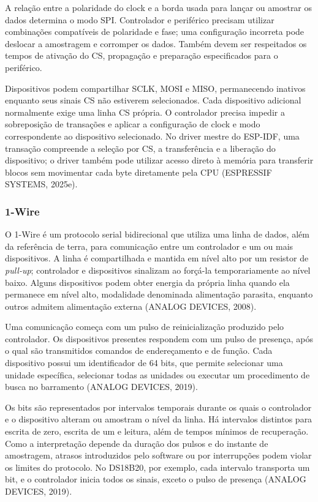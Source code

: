 \documentclass[a4paper,12pt]{article}
\begin{document}
A rela\c{c}\~ao entre a polaridade do clock e a borda usada para lan\c{c}ar ou amostrar os dados determina o modo SPI. Controlador e perif\'erico precisam utilizar combina\c{c}\~oes compat\'iveis de polaridade e fase; uma configura\c{c}\~ao incorreta pode deslocar a amostragem e corromper os dados. Tamb\'em devem ser respeitados os tempos de ativa\c{c}\~ao do CS, propaga\c{c}\~ao e prepara\c{c}\~ao especificados para o perif\'erico.


Dispositivos podem compartilhar SCLK, MOSI e MISO, permanecendo inativos enquanto seus sinais CS n\~ao estiverem selecionados. Cada dispositivo adicional normalmente exige uma linha CS pr\'opria. O controlador precisa impedir a sobreposi\c{c}\~ao de transa\c{c}\~oes e aplicar a configura\c{c}\~ao de clock e modo correspondente ao dispositivo selecionado. No driver mestre do ESP-IDF, uma transa\c{c}\~ao compreende a sele\c{c}\~ao por CS, a transfer\^encia e a libera\c{c}\~ao do dispositivo; o driver tamb\'em pode utilizar acesso direto \`a mem\'oria para transferir blocos sem movimentar cada byte diretamente pela CPU (ESPRESSIF SYSTEMS, 2025e).


\subsubsection{1-Wire}


O 1-Wire \'e um protocolo serial bidirecional que utiliza uma linha de dados, al\'em da refer\^encia de terra, para comunica\c{c}\~ao entre um controlador e um ou mais dispositivos. A linha \'e compartilhada e mantida em n\'ivel alto por um resistor de \emph{pull-up}; controlador e dispositivos sinalizam ao for\c{c}\'a-la temporariamente ao n\'ivel baixo. Alguns dispositivos podem obter energia da pr\'opria linha quando ela permanece em n\'ivel alto, modalidade denominada alimenta\c{c}\~ao parasita, enquanto outros admitem alimenta\c{c}\~ao externa (ANALOG DEVICES, 2008).


Uma comunica\c{c}\~ao come\c{c}a com um pulso de reinicializa\c{c}\~ao produzido pelo controlador. Os dispositivos presentes respondem com um pulso de presen\c{c}a, ap\'os o qual s\~ao transmitidos comandos de endere\c{c}amento e de fun\c{c}\~ao. Cada dispositivo possui um identificador de 64 bits, que permite selecionar uma unidade espec\'ifica, selecionar todas as unidades ou executar um procedimento de busca no barramento (ANALOG DEVICES, 2019).


Os bits s\~ao representados por intervalos temporais durante os quais o controlador e o dispositivo alteram ou amostram o n\'ivel da linha. H\'a intervalos distintos para escrita de zero, escrita de um e leitura, al\'em de tempos m\'inimos de recupera\c{c}\~ao. Como a interpreta\c{c}\~ao depende da dura\c{c}\~ao dos pulsos e do instante de amostragem, atrasos introduzidos pelo software ou por interrup\c{c}\~oes podem violar os limites do protocolo. No DS18B20, por exemplo, cada intervalo transporta um bit, e o controlador inicia todos os sinais, exceto o pulso de presen\c{c}a (ANALOG DEVICES, 2019).
\end{document}
